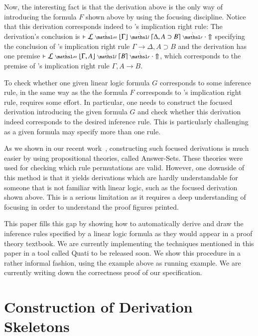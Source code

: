 \documentclass[a4paper,10pt]{article}
\newcommand\lra{\longrightarrow}
\begin{document}
Now, the interesting fact is that the derivation above is the only way of introducing the formula $F$ 
shown above by using the focusing 
discipline. Notice that this derivation corresponds indeed to \mLJ's 
implication right rule: The derivation's conclusion is $\llfDash \lEnc \ndots{\infty}
\lft{\Gamma} \ndots{l} {\rght{\Delta, A \supset B}}
\ndots{r} \cdot \Uparrow$ specifying the conclusion of \mLJ's 
implication right rule $\Gamma \lra \Delta, A \supset B$ and 
the derivation has one premise $\llfDash \lEnc \ndots{\infty} \lft{\Gamma, A} \ndots{l} \rght{B} \ndots{r}
\cdot \Uparrow$, which corresponds to the premise of \mLJ's 
implication right rule $\Gamma, A \lra B$.

To check whether one given linear logic formula $G$ corresponds to some inference rule, in the same way as the 
the formula $F$ corresponds to \mLJ's implication right rule, requires some effort. In particular, one needs
to construct the focused derivation introducing the given formula $G$ and check whether this derivation indeed
corresponds to the desired inference rule. This is particularly challenging as a given formula may specify 
more than one rule. 

As we shown in our recent work~\cite{nigam13iclp}, constructing such focused derivations is 
much easier by using propositional theories, called Answer-Sets. These theories were used for
checking which rule permutations are valid. However, one downside of this method is that it 
yields derivations which are hardly understandable for someone that is not familiar with linear logic, 
such as the focused derivation shown above. This is a serious limitation as it requires
a deep understanding of focusing in order to understand the proof figures printed.

This paper fills this gap by showing how to automatically derive and draw the inference rules
specified by a linear logic formula as they would appear in a proof theory textbook. We are currently
implementing the techniques mentioned in this paper in a tool called Quati to be released soon.
We show this procedure in a rather informal fashion, using the example above as running example. 
We are currently writing down the correctness proof of our specification.


\section{Construction of Derivation Skeletons}
\end{document}
